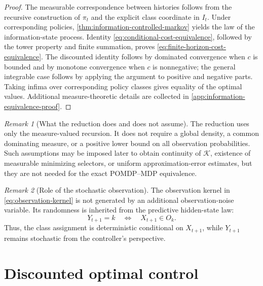 \documentclass[10pt,twocolumn]{article}
\theoremstyle{remark}
\newtheorem{remark}{Remark}
\begin{document}
\begin{proof}
	The measurable correspondence between histories follows from the recursive construction of $\pi_t$ and the explicit class coordinate in $I_t$. Under corresponding policies, \cref{thm:information-controlled-markov} yields the law of the information-state process. Identity \cref{eq:conditional-cost-equivalence}, followed by the tower property and finite summation, proves \cref{eq:finite-horizon-cost-equivalence}. The discounted identity follows by dominated convergence when $c$ is bounded and by monotone convergence when $c$ is nonnegative; the general integrable case follows by applying the argument to positive and negative parts. Taking infima over corresponding policy classes gives equality of the optimal values. Additional measure-theoretic details are collected in \cref{app:information-equivalence-proof}.
\end{proof}

\begin{remark}[What the reduction does and does not assume]
	\label{rem:reduction-no-density}
	The reduction uses only the measure-valued recursion. It does not require a global density, a common dominating measure, or a positive lower bound on all observation probabilities. Such assumptions may be imposed later to obtain continuity of $\mathcal K$, existence of measurable minimizing selectors, or uniform approximation-error estimates, but they are not needed for the exact POMDP--MDP equivalence.
\end{remark}

\begin{remark}[Role of the stochastic observation]
	\label{rem:stochastic-observation-reduction}
	The observation kernel in \cref{eq:observation-kernel} is not generated by an additional observation-noise variable. Its randomness is inherited from the predictive hidden-state law:
	\[
	Y_{t+1}=k
	\quad\Longleftrightarrow\quad
	X_{t+1}\in O_k.
	\]
	Thus, the class assignment is deterministic conditional on $X_{t+1}$, while $Y_{t+1}$ remains stochastic from the controller's perspective.
\end{remark}


%
%

\section{Discounted optimal control}
\label{sec:discounted-control}
\end{document}
